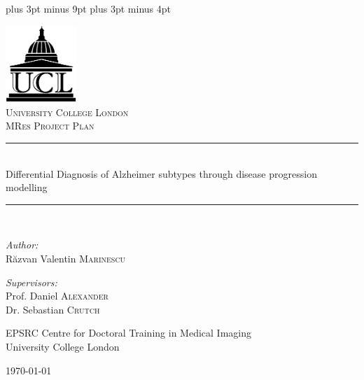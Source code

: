 \documentclass[12pt,a4paper,oneside]{report}
\begin{document}
\belowdisplayskip=12pt plus 3pt minus 9pt
\belowdisplayshortskip=7pt plus 3pt minus 4pt


\begin{titlepage}
\begin{center}

\includegraphics[width=0.2\textwidth]{ucl-logo2}~\\[1cm]

\textsc{\LARGE University College London}\\[1.5cm]

\textsc{\Large MRes Project Plan}\\[0.5cm]

\newcommand{\HRule}{\rule{\linewidth}{0.5mm}}

\HRule \\[0.4cm]
{ \Large Differential Diagnosis of Alzheimer subtypes through disease progression modelling \\[0.4cm] }

\HRule \\[1.5cm]

\begin{minipage}{0.4\textwidth}
\begin{flushleft} \large
\emph{Author:}\\
R\u{a}zvan Valentin \textsc{Marinescu}
\end{flushleft}
\end{minipage}
\begin{minipage}{0.4\textwidth}
\begin{flushright} \large
\emph{Supervisors:} \\
Prof. Daniel \textsc{Alexander}\\
Dr. Sebastian \textsc{Crutch}
\end{flushright}
\end{minipage}

\vfill

EPSRC Centre for Doctoral Training in Medical Imaging\\ University College London

\vfill

{\large \today}

\end{center}
\end{titlepage}
\end{document}

